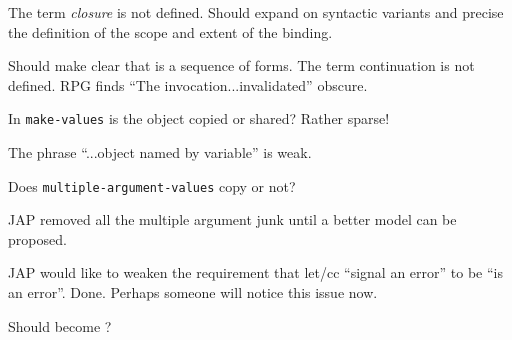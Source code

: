 \label{subsubsec:variable-binding}
%
\begin{optPrivate}
    The term {\em closure} is not defined.  Should expand on syntactic variants
    and precise the definition of the scope and extent of the binding.

    Should make clear that  is a sequence of forms.  The term
    continuation is not defined.  RPG finds ``The invocation...invalidated''
    obscure.

    In {\tt make-values} is the object copied or shared?  Rather sparse!

    The phrase ``...object named by variable'' is weak.

    Does {\tt multiple-argument-values} copy or not?

    JAP removed all the multiple argument junk until a better model can be
    proposed.

    JAP would like to weaken the requirement that let/cc ``signal an error'' to
    be ``is an error''.  Done.  Perhaps someone will notice this issue now.

    Should  become ?
\end{optPrivate}
%
